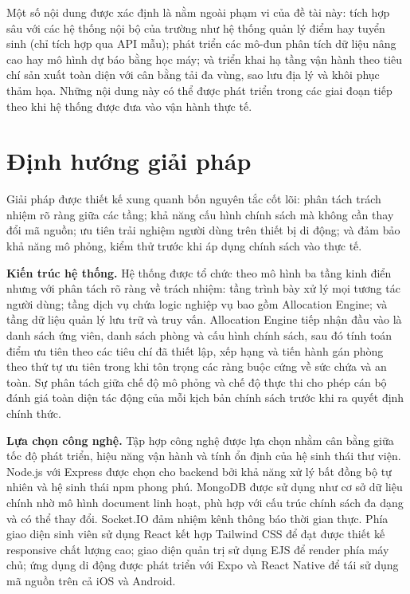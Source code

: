 ﻿\documentclass[a4paper,12pt,openany,oneside]{report}
\begin{document}
Một số nội dung được xác định là nằm ngoài phạm vi của đề tài này: tích hợp
sâu với các hệ thống nội bộ của trường như hệ thống quản lý điểm hay tuyển sinh
(chỉ tích hợp qua API mẫu); phát triển các mô-đun phân tích dữ liệu nâng cao
hay mô hình dự báo bằng học máy; và triển khai hạ tầng vận hành theo tiêu chí
sản xuất toàn diện với cân bằng tải đa vùng, sao lưu địa lý và khôi phục thảm
họa. Những nội dung này có thể được phát triển trong các giai đoạn tiếp theo khi
hệ thống được đưa vào vận hành thực tế.

\section{Định hướng giải pháp}

Giải pháp được thiết kế xung quanh bốn nguyên tắc cốt lõi: phân tách trách
nhiệm rõ ràng giữa các tầng; khả năng cấu hình chính sách mà không cần thay
đổi mã nguồn; ưu tiên trải nghiệm người dùng trên thiết bị di động; và đảm bảo
khả năng mô phỏng, kiểm thử trước khi áp dụng chính sách vào thực tế.

\textbf{Kiến trúc hệ thống.} Hệ thống được tổ chức theo mô hình ba tầng kinh
điển nhưng với phân tách rõ ràng về trách nhiệm: tầng trình bày xử lý mọi tương
tác người dùng; tầng dịch vụ chứa logic nghiệp vụ bao gồm Allocation Engine; và
tầng dữ liệu quản lý lưu trữ và truy vấn. Allocation Engine tiếp nhận đầu vào
là danh sách ứng viên, danh sách phòng và cấu hình chính sách, sau đó tính toán
điểm ưu tiên theo các tiêu chí đã thiết lập, xếp hạng và tiến hành gán phòng
theo thứ tự ưu tiên trong khi tôn trọng các ràng buộc cứng về sức chứa và an
toàn. Sự phân tách giữa chế độ mô phỏng và chế độ thực thi cho phép cán bộ
đánh giá toàn diện tác động của mỗi kịch bản chính sách trước khi ra quyết định
chính thức.

\textbf{Lựa chọn công nghệ.} Tập hợp công nghệ được lựa chọn nhằm cân bằng
giữa tốc độ phát triển, hiệu năng vận hành và tính ổn định của hệ sinh thái thư
viện. Node.js với Express được chọn cho backend bởi khả năng xử lý bất đồng bộ
tự nhiên và hệ sinh thái npm phong phú. MongoDB được sử dụng như cơ sở dữ liệu
chính nhờ mô hình document linh hoạt, phù hợp với cấu trúc chính sách đa dạng
và có thể thay đổi. Socket.IO đảm nhiệm kênh thông báo thời gian thực. Phía
giao diện sinh viên sử dụng React kết hợp Tailwind CSS để đạt được thiết kế
responsive chất lượng cao; giao diện quản trị sử dụng EJS để render phía máy
chủ; ứng dụng di động được phát triển với Expo và React Native để tái sử dụng
mã nguồn trên cả iOS và Android.
\end{document}
